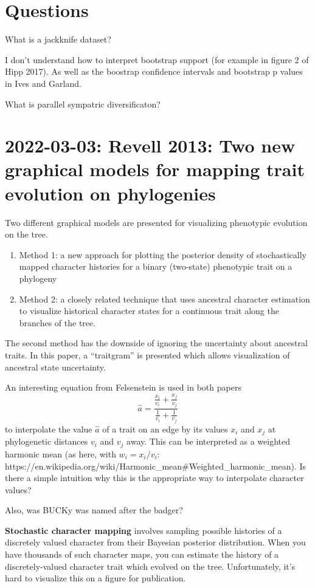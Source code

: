 \documentclass{article}
\begin{document}
\section{Questions} What is a jackknife dataset?

I don't understand how to interpret bootstrap support (for example in figure 2
of Hipp 2017). As well as the boostrap confidence intervals and bootstrap p
values in Ives and Garland. 

What is parallel sympatric diversificaton?


\section{2022-03-03: Revell 2013: Two new graphical models for mapping trait
  evolution on phylogenies}

Two different graphical models are presented for visualizing phenotypic
evolution on the tree.
\begin{enumerate}
\item Method 1: a new approach for plotting the posterior density of
  stochastically mapped character histories for a binary (two-state) phenotypic
  trait on a phylogeny
\item Method 2: a closely related technique that uses ancestral character
  estimation to visualize historical character states for a continuous trait
  along the branches of the tree.
\end{enumerate}
The second method has the downside of ignoring the uncertainty about ancestral
traits. In this paper, a ``traitgram'' is presented which allows visualization
of ancestral state uncertainty.

An interesting equation from Felsenstein is used in both papers
\begin{equation*}
  \hat{a}= \frac
  {\frac{x_{i}}{v_{i}}+ \frac{x_{j}}{v_{j}}}
  {\frac{1}{v_{i}}+\frac{1}{v_{j}}}
\end{equation*}
to interpolate the value $\hat{a}$ of a trait on an edge by its values $x_{i}$
and $x_{j}$ at phylogenetic distances $v_{i}$ and $v_{j}$ away. This can be interpreted as a weighted harmonic mean (as here, with $w_{i}=x_{i}/v_{i}$: https://en.wikipedia.org/wiki/Harmonic_mean#Weighted_harmonic_mean). Is there a simple intuition why this is the appropriate way to interpolate character values? 

Also, was BUCKy was named after the badger?

\textbf{Stochastic character mapping} involves sampling possible histories of a
discretely valued character from their Bayesian posterior distribution. When you
have thousands of such character maps, you can estimate the history of a
discretely-valued character trait which evolved on the tree. Unfortunately, it's
hard to visualize this on a figure for publication.
\end{document}
